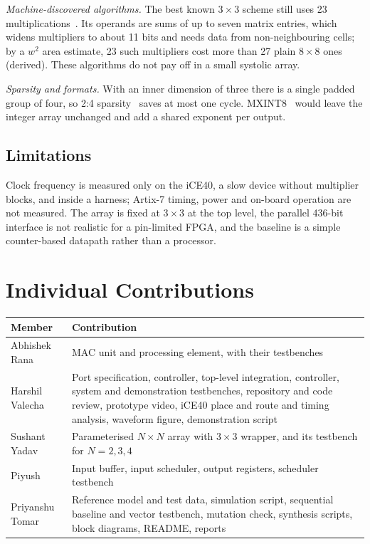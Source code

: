 \documentclass[conference]{IEEEtran}
\begin{document}
\emph{Machine-discovered algorithms.} The best known $3 \times 3$ scheme still uses 23 multiplications~\cite{laderman1976, alphaevolve}. Its operands are sums of up to seven matrix entries, which widens multipliers to about 11 bits and needs data from non-neighbouring cells; by a $w^2$ area estimate, 23 such multipliers cost more than 27 plain $8 \times 8$ ones (derived). These algorithms do not pay off in a small systolic array.

\emph{Sparsity and formats.} With an inner dimension of three there is a single padded group of four, so 2:4 sparsity~\cite{mishra2021, s2ta} saves at most one cycle. MXINT8~\cite{ocpmx} would leave the integer array unchanged and add a shared exponent per output.

\subsection{Limitations}
Clock frequency is measured only on the iCE40, a slow device without multiplier blocks, and inside a harness; Artix-7 timing, power and on-board operation are not measured. The array is fixed at $3 \times 3$ at the top level, the parallel 436-bit interface is not realistic for a pin-limited FPGA, and the baseline is a simple counter-based datapath rather than a processor.

\section{Individual Contributions}
\label{sec:contrib}
\begin{center}
\begin{tabular}{@{}lp{}@{}}
\toprule
Member & Contribution \\
\midrule
Abhishek Rana & MAC unit and processing element, with their testbenches \\
Harshil Valecha & Port specification, controller, top-level integration, controller, system and demonstration testbenches, repository and code review, prototype video, iCE40 place and route and timing analysis, waveform figure, demonstration script \\
Sushant Yadav & Parameterised $N \times N$ array with $3 \times 3$ wrapper, and its testbench for $N = 2, 3, 4$ \\
Piyush & Input buffer, input scheduler, output registers, scheduler testbench \\
Priyanshu Tomar & Reference model and test data, simulation script, sequential baseline and vector testbench, mutation check, synthesis scripts, block diagrams, README, reports \\
\bottomrule
\end{tabular}
\end{center}
\end{document}
